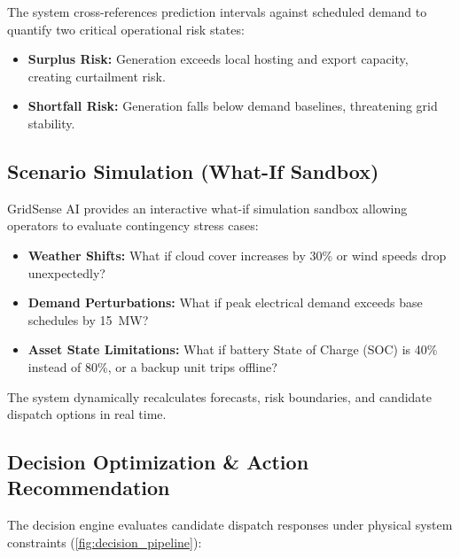 The system cross-references prediction intervals against scheduled demand to quantify two critical operational risk states:
\begin{itemize}[leftmargin=1.5em, itemsep=0.15em]
    \item \textbf{Surplus Risk:} Generation exceeds local hosting and export capacity, creating curtailment risk.
    \item \textbf{Shortfall Risk:} Generation falls below demand baselines, threatening grid stability.
\end{itemize}

\subsection{Scenario Simulation (What-If Sandbox)}
\label{subsec:scenario_simulation}

GridSense AI provides an interactive what-if simulation sandbox allowing operators to evaluate contingency stress cases:
\begin{itemize}[leftmargin=1.5em, itemsep=0.15em]
    \item \textbf{Weather Shifts:} What if cloud cover increases by 30\% or wind speeds drop unexpectedly?
    \item \textbf{Demand Perturbations:} What if peak electrical demand exceeds base schedules by 15~MW?
    \item \textbf{Asset State Limitations:} What if battery State of Charge (SOC) is 40\% instead of 80\%, or a backup unit trips offline?
\end{itemize}
The system dynamically recalculates forecasts, risk boundaries, and candidate dispatch options in real time.

\subsection{Decision Optimization \& Action Recommendation}
\label{subsec:decision_optimization}

The decision engine evaluates candidate dispatch responses under physical system constraints (\cref{fig:decision_pipeline}):

